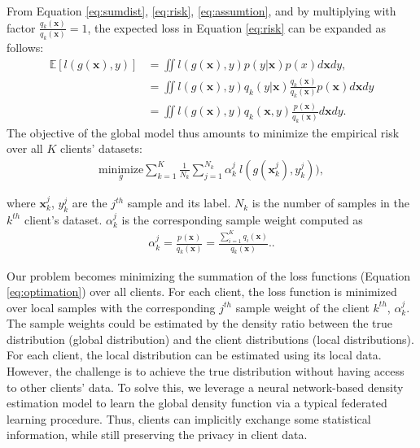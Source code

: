 \documentclass[mathfont=newtx]{uai2023} %
\newcommand{\px}[2]{p_{#1}(\mathbf{x_{#2}})}
\begin{document}
From Equation \ref{eq:sumdist}, \ref{eq:risk}, \ref{eq:assumtion}, and by multiplying with factor $\frac{q_k(\mathbf{x})}{q_k(\mathbf{x})}=1$, the expected loss in Equation \ref{eq:risk} can be expanded as follows:
\begin{align}
	\mathbb{E}[l(g(\mathbf{x}),y)]  &= \iint l(g(\mathbf{x}),y) p(y|\mathbf{x}) p(x) d\mathbf{x}dy,\\
	&= \iint l(g(\mathbf{x}),y) q_k(y|\mathbf{x}) \frac{q_k(\mathbf{x})}{q_k(\mathbf{x})}  p(\mathbf{x}) d\mathbf{x}dy \\
	&= \iint l(g(\mathbf{x}),y) q_k(\mathbf{x},y) \frac{p(\mathbf{x})}{q_k(\mathbf{x})}  d\mathbf{x}dy.    \label{eq:expectedloss}
\end{align}
The objective of the global model thus amounts to minimize the empirical risk over all $K$ clients' datasets:
\begin{equation}
	\begin{aligned}
	\underset{g}{\text{minimize}}
	 \sum_{k=1}^{K} \frac{1}{N_k}\sum_{j=1}^{N_k} \alpha_k^j \:l(g(\mathbf{x}_k^j),y_k^j)), \label{eq:optimation}
	\end{aligned}
\end{equation} 

where $\mathbf{x}_k^j$, $y_k^j$ are the $j^{th}$ sample and its label. $N_k$ is the number of samples in the $k^{th}$ client's dataset. $\alpha_k^j$ is the corresponding sample weight computed as
\begin{equation}
\begin{aligned}
	\boxed{\alpha_k^j = \frac{ \px{}{}}{q_k(\mathbf{x})}  = \frac{ \sum_{i=1}^{K}q_i(\mathbf{x}) }{q_k(\mathbf{x})}. }  
	\label{eq:alpha}.
\end{aligned}
\end{equation}

Our problem becomes minimizing the summation of the loss functions (Equation \ref{eq:optimation}) over all clients. For each client, the loss function is minimized over local samples with the corresponding $j^{th}$ sample weight of the client $k^{th}$, $\alpha_k^j$. The sample weights could be estimated by the density ratio between the true distribution (global distribution) and the client distributions (local distributions). For each client, the local distribution can be estimated using its local data. However, the challenge is to achieve the true distribution without having access to other clients' data. To solve this, we leverage a neural network-based density estimation model to learn the global density function via a typical federated learning procedure. Thus, clients can implicitly exchange some statistical information, while still preserving the privacy in client data.          
\end{document}
